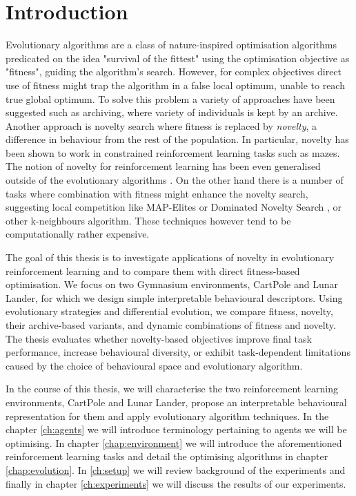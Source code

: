 \chapter*{Introduction}

Evolutionary algorithms are a class of nature-inspired optimisation algorithms predicated on the idea "survival of the fittest" using the optimisation objective as "fitness", guiding the algorithm's search. However, for complex objectives direct use of fitness might trap the algorithm in a false local optimum, unable to reach true global optimum. To solve this problem a variety of approaches have been suggested such as archiving, where variety of individuals is kept by an archive. Another approach is novelty search where fitness is replaced by \emph{novelty}, a difference in behaviour from the rest of the population. In particular, novelty has been shown to work in constrained reinforcement learning tasks such as mazes. The notion of novelty for reinforcement learning has been even generalised outside of the evolutionary algorithms \cite{Aubret_2023}. 
On the other hand there is a number of tasks where combination with fitness might enhance the novelty search, suggesting local competition like MAP-Elites \citep{mapelite} or Dominated Novelty Search \citep{dominated}, or other k-neighbours algorithm. These techniques however tend to be computationally rather expensive.
 
 
 The goal of this thesis is to investigate applications of novelty in evolutionary reinforcement learning and to compare them with direct fitness-based optimisation. We focus on two Gymnasium environments, CartPole and Lunar Lander, for which we design simple interpretable behavioural descriptors. Using evolutionary strategies and differential evolution, we compare fitness, novelty, their archive-based variants, and dynamic combinations of fitness and novelty. The thesis evaluates whether novelty-based objectives improve final task performance, increase behavioural diversity, or exhibit task-dependent limitations caused by the choice of behavioural space and evolutionary algorithm.
 
In the course of this thesis, we will characterise the two reinforcement learning environments, CartPole and Lunar Lander, propose an interpretable behavioural representation for them and apply evolutionary algorithm techniques. 
In the chapter \ref{ch:agents} we will introduce terminology pertaining to agents we will be optimising. In chapter \ref{chap:environment} we will introduce the aforementioned reinforcement learning tasks and detail the optimising algorithms in chapter \ref{chap:evolution}. In \cref{ch:setup} we will review background of the experiments and finally in chapter \ref{ch:experiments} we will discuss the results of our experiments.